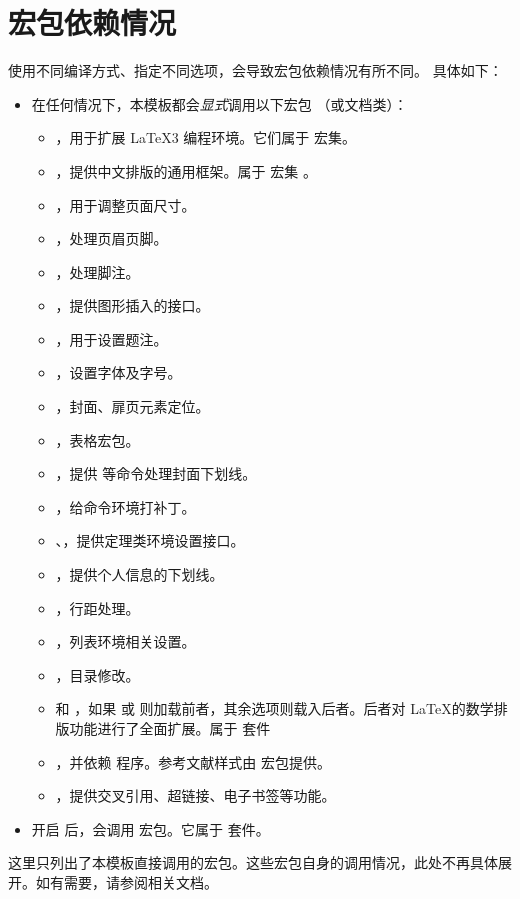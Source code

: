 
\section{宏包依赖情况}

使用不同编译方式、指定不同选项，会导致宏包依赖情况有所不同。
具体如下：
\begin{itemize}
  \item 在任何情况下，本模板都会\emph{显式}调用以下宏包
    （或文档类）：
    \begin{itemize}
      \item {}，用于扩展 \LaTeX3 编程环境。它们属于  宏集。
      \item {}，提供中文排版的通用框架。属于 \CTeX{} 宏集 。
      \item {}，用于调整页面尺寸。
      \item {}，处理页眉页脚。
      \item {}，处理脚注。
      \item {}，提供图形插入的接口。
      \item {}，用于设置题注。
      \item {}，设置字体及字号。
      \item {}，封面、扉页元素定位。
      \item {}，表格宏包。
      \item {}，提供  等命令处理封面下划线。
      \item {}，给命令环境打补丁。
      \item {}、，提供定理类环境设置接口。
      \item {}，提供个人信息的下划线。
      \item {}，行距处理。
      \item {}，列表环境相关设置。
      \item {}，目录修改。
      \item {} 和 ，如果  或  则加载前者，其余选项则载入后者。后者对 \LaTeX 的数学排版功能进行了全面扩展。属于 \AmSLaTeX 套件
      \item  {}，并依赖 \biber{} 程序。参考文献样式由 宏包提供。
      \item {}，提供交叉引用、超链接、电子书签等功能。
    \end{itemize}
  \item 开启  后，会调用
     宏包。它属于  套件。
\end{itemize}

这里只列出了本模板直接调用的宏包。这些宏包自身的调用情况，此处不再具体展开。如有需要，请参阅相关文档。
